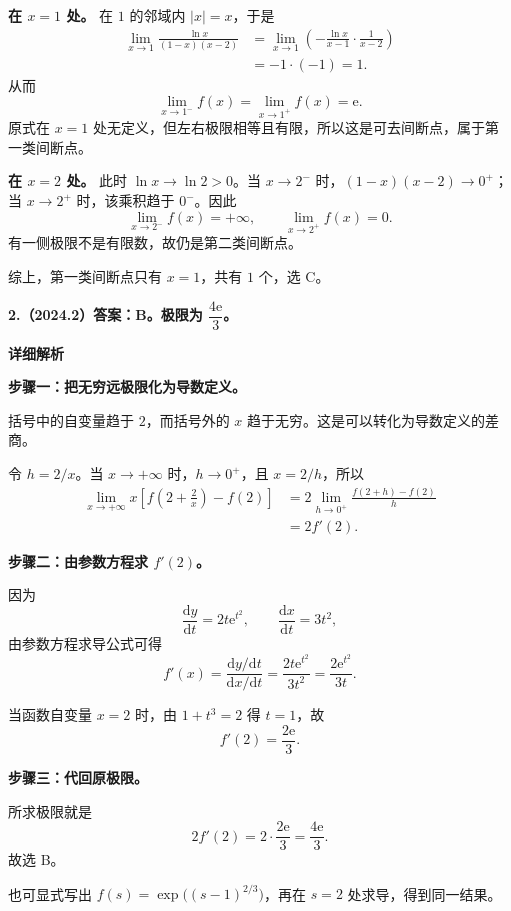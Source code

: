 \documentclass[UTF8,11pt,fontset=windows]{ctexart}
\begin{document}
\textbf{在 $x=1$ 处。} 在 $1$ 的邻域内 $|x|=x$，于是
$$
\begin{aligned}
\lim_{x\to1}\frac{\ln x}{(1-x)(x-2)}
&=\lim_{x\to1}\left(-\frac{\ln x}{x-1}\cdot\frac1{x-2}\right)\\
&=-1\cdot(-1)=1.
\end{aligned}
$$
从而
$$
\lim_{x\to1^-}f(x)=\lim_{x\to1^+}f(x)=\mathrm e.
$$
原式在 $x=1$ 处无定义，但左右极限相等且有限，所以这是可去间断点，属于第一类间断点。

\textbf{在 $x=2$ 处。} 此时 $\ln x\to\ln2>0$。当 $x\to2^-$ 时，$(1-x)(x-2)\to0^+$；当 $x\to2^+$ 时，该乘积趋于 $0^-$。因此
$$
\lim_{x\to2^-}f(x)=+\infty,
\qquad
\lim_{x\to2^+}f(x)=0.
$$
有一侧极限不是有限数，故仍是第二类间断点。

综上，第一类间断点只有 $x=1$，共有 $1$ 个，选 C。

\clearpage

\textbf{2.（2024.2）答案：B。极限为 $\dfrac{4\mathrm e}{3}$。}

\textbf{详细解析}

\textbf{步骤一：把无穷远极限化为导数定义。}

括号中的自变量趋于 $2$，而括号外的 $x$ 趋于无穷。这是可以转化为导数定义的差商。

令 $h=2/x$。当 $x\to+\infty$ 时，$h\to0^+$，且 $x=2/h$，所以
$$
\begin{aligned}
\lim_{x\to+\infty}x\left[f\left(2+\frac2x\right)-f(2)\right]
&=2\lim_{h\to0^+}\frac{f(2+h)-f(2)}h\\
&=2f'(2).
\end{aligned}
$$

\textbf{步骤二：由参数方程求 $f'(2)$。}

因为
$$
\frac{\mathrm dy}{\mathrm dt}=2t\mathrm e^{t^2},
\qquad
\frac{\mathrm dx}{\mathrm dt}=3t^2,
$$
由参数方程求导公式可得
$$
f'(x)=\frac{\mathrm dy/\mathrm dt}{\mathrm dx/\mathrm dt}
=\frac{2t\mathrm e^{t^2}}{3t^2}
=\frac{2\mathrm e^{t^2}}{3t}.
$$

当函数自变量 $x=2$ 时，由 $1+t^3=2$ 得 $t=1$，故
$$
f'(2)=\frac{2\mathrm e}{3}.
$$

\textbf{步骤三：代回原极限。}

所求极限就是
$$
\boxed{2f'(2)=2\cdot\frac{2\mathrm e}{3}
=\frac{4\mathrm e}{3}}.
$$
故选 B。

也可显式写出 $f(s)=\exp\bigl((s-1)^{2/3}\bigr)$，再在 $s=2$ 处求导，得到同一结果。
\end{document}
